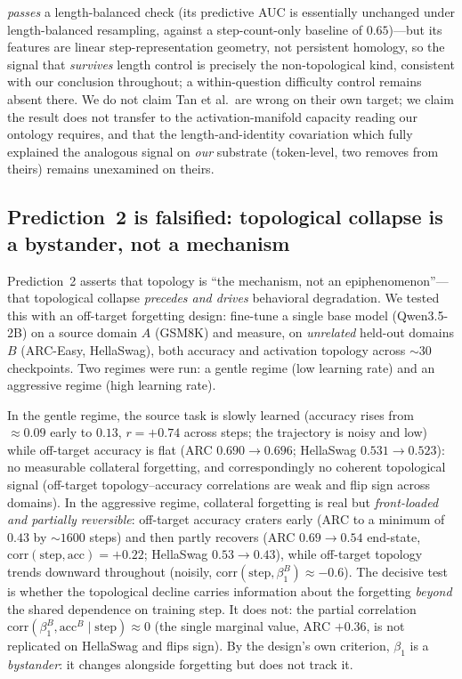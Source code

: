 \documentclass{article}
\begin{document}
\emph{passes} a length-balanced check (its predictive AUC is essentially unchanged under
length-balanced resampling, against a step-count-only baseline of $0.65$)---but its features are
linear step-representation geometry, not persistent homology, so the signal that \emph{survives}
length control is precisely the non-topological kind, consistent with our conclusion throughout;
a within-question difficulty control remains absent there. We do not claim Tan et al.\ are wrong on their own target; we claim the
result does not transfer to the activation-manifold capacity reading our ontology requires, and that
the length-and-identity covariation which fully explained the analogous signal on \emph{our}
substrate (token-level, two removes from theirs) remains unexamined on theirs.

\subsection{Prediction~2 is falsified: topological collapse is a bystander, not a mechanism}
\label{sec:empirical-p2}
Prediction~2 asserts that topology is ``the mechanism, not an epiphenomenon''---that topological
collapse \emph{precedes and drives} behavioral degradation. We tested this with an off-target
forgetting design: fine-tune a single base model (Qwen3.5-2B) on a source domain
\(A\) (GSM8K) and measure, on \emph{unrelated} held-out domains \(B\) (ARC-Easy, HellaSwag),
both accuracy and activation topology across \(\sim\!30\) checkpoints. Two regimes were run:
a gentle regime (low learning rate) and an aggressive regime (high learning rate).

In the gentle regime, the source task is slowly learned (accuracy rises from \(\approx\!0.09\)
early to \(0.13\), \(r = +0.74\) across steps; the trajectory is noisy and low) while off-target
accuracy is flat (ARC \(0.690 \to 0.696\); HellaSwag \(0.531 \to 0.523\)): no measurable
collateral forgetting, and correspondingly no coherent topological signal (off-target
topology--accuracy correlations are weak and flip sign across domains). In the aggressive regime,
collateral forgetting is real but \emph{front-loaded and partially reversible}: off-target accuracy
craters early (ARC to a minimum of \(0.43\) by \(\sim\!1600\) steps) and then partly recovers
(ARC \(0.69 \to 0.54\) end-state, \(\mathrm{corr}(\text{step}, \text{acc}) = +0.22\); HellaSwag
\(0.53 \to 0.43\)), while off-target topology trends downward throughout (noisily, \(\mathrm{corr}(\text{step}, \beta_1^{B}) \approx -0.6\)). The decisive test
is whether the topological decline carries information
about the forgetting \emph{beyond} the shared dependence on training step. It does not: the
partial correlation \(\mathrm{corr}(\beta_1^{B}, \mathrm{acc}^{B} \mid \text{step}) \approx 0\)
(the single marginal value, ARC \(+0.36\), is not replicated on HellaSwag and flips sign). By
the design's own criterion, \(\beta_1\) is a \emph{bystander}: it changes alongside forgetting
but does not track it.
\end{document}
